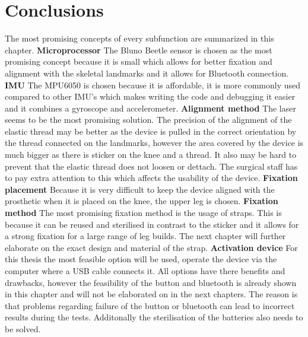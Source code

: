 \documentclass[whitelogo]{tudelft-report}
\begin{document}
{{{\section{Conclusions}
The most promising concepts of every subfunction are summarized in this chapter. 
\newline
\newline
\textbf{Microprocessor} \newline
The Bluno Beetle sensor is chosen as the most promising concept because it is small which allows for better fixation and alignment with the skeletal landmarks and it allows for Bluetooth connection.  \newline
\newline
\textbf{IMU} \newline
The MPU6050 is chosen because it is affordable, it is more commonly used compared to other IMU's which makes writing the code and debugging it easier and it combines a gyroscope and accelerometer. 
\newline
\newline
\textbf{Alignment method} \newline
The laser seems to be the most promising solution. The precision of the alignment of the elastic thread may be better as the device is pulled in the correct orientation by the thread connected on the landmarks, however the area covered by the device is much bigger as there is sticker on the knee and a thread. It also may be hard to prevent that the elastic thread does not loosen or dettach. The surgical staff has to pay extra attention to this which affects the usability of the device. 
\newline
\newline
\textbf{Fixation placement} \newline
Because it is very difficult to keep the device aligned with the prosthetic when it is placed on the knee, the upper leg is chosen.  
\newline 
\newline
\textbf{Fixation method} \newline
The most promising fixation method is the usage of straps. This is because it can be reused and sterilised in contrast to the sticker and it allows for a strong fixation for a large range of leg builds. The next chapter will further elaborate on the exact design and material of the strap. 
\newline
\newline
\textbf{Activation device} \newline
For this thesis the most feasible option will be used, operate the device via the computer where a USB cable connects it. All options have there benefits and drawbacks, however the feasibility of the button and bluetooth is already shown in this chapter and will not be elaborated on in the next chapters. The reason is that problems regarding failure of the button or bluetooth can lead to incorrect results during the tests. Additonally the sterilisation of the batteries also needs to be solved.  


}}}
\end{document}
